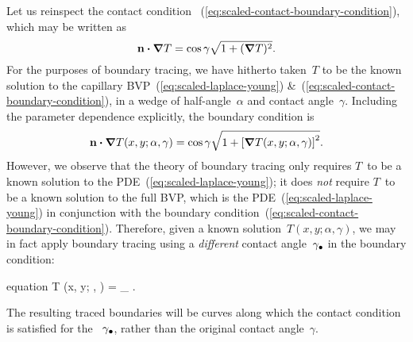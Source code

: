 Let us reinspect the contact condition~%
  (\ref{eq:scaled-contact-boundary-condition}),
which may be written as
\begin{equation}
  \mathop{}\!\boldsymbol{\mathbf{n}} \boldsymbol{\cdot} \mathop{}\!\boldsymbol{\mathbf{\nabla}} T = \cos\gamma \sqrt{1 + (\mathop{}\!\boldsymbol{\mathbf{\nabla}} T)^2}.
  \label{eq:moderate-flux-boundary-condition-reinspect}
\end{equation}
For the purposes of boundary tracing,
we have hitherto taken~$T$ to be the known solution
to the capillary BVP~(\ref{eq:scaled-laplace-young})
\&~(\ref{eq:scaled-contact-boundary-condition}),
in a wedge of half-angle~$\alpha$
and contact angle~$\gamma$.
Including the parameter dependence explicitly,
the boundary condition is
\begin{equation}
  \normalvec \dotp \del T (x, y; \alpha, \gamma) =
    \cos\gamma
    \sqrt{1 + \squarebr[\bulkysize]{\del T (x, y; \alpha, \gamma)}^2}.
  \label{eq:moderate-flux-boundary-condition-with-parameters}
\end{equation}
However, we observe that the theory of boundary tracing
only requires $T$~to be a known solution
to the PDE~(\ref{eq:scaled-laplace-young});
it does \emph{not} require $T$~to be a known solution to the full BVP\@,
which is the PDE~(\ref{eq:scaled-laplace-young}) in conjunction with
the boundary condition~(\ref{eq:scaled-contact-boundary-condition}).
Therefore,
given a known solution~$T (x, y; \alpha, \gamma)$,
we may in fact apply boundary tracing
using a \emph{different} contact angle~$\gamma_\bullet$
in the boundary condition:
\begin{important}{equation}
  \normalvec \dotp \del T (x, y; \alpha, \gamma) =
    \cos\gamma_\tr
    .
  \label{eq:moderate-flux-boundary-condition-different-angle}
\end{important}
The resulting traced boundaries will be curves along which
the contact condition is satisfied
for the ~$\gamma_\bullet$,
rather than the original contact angle~$\gamma$.

